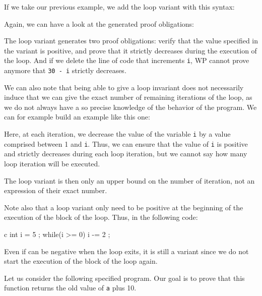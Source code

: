 If we take our previous example, we add the loop variant with this
syntax:






Again, we can have a look at the generated proof obligations:





The loop variant generates two proof obligations: verify that the value
specified in the variant is positive, and prove that it strictly
decreases during the execution of the loop. And if we delete the line of
code that increments \texttt{i}, WP cannot prove anymore that
\texttt{30\ -\ i} strictly decreases.

We can also note that being able to give a loop invariant does not
necessarily induce that we can give the exact number of remaining
iterations of the loop, as we do not always have a so precise knowledge
of the behavior of the program. We can for example build an example like
this one:






Here, at each iteration, we decrease the value of the variable
\texttt{i} by a value comprised between 1 and \texttt{i}. Thus, we can
ensure that the value of \texttt{i} is positive and strictly decreases
during each loop iteration, but we cannot say how many loop iteration
will be executed.



The loop variant is then only an upper bound on the number of iteration,
not an expression of their exact number.


Note also that a loop variant only need to be positive at the beginning
of the execution of the block of the loop. Thus, in the following code:


\begin{CodeBlock}{c}
int i = 5 ;
while(i >= 0){
  i -= 2 ;
}
\end{CodeBlock}

Even if  can be negative when the loop exits, it is still
a variant since we do not start the execution of the block of the loop
again.




Let us consider the following specified program. Our goal is to prove
that this function returns the old value of \texttt{a} plus 10.




